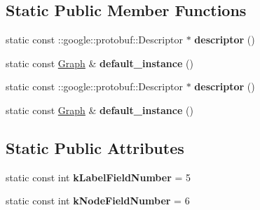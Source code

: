 \subsection*{Static Public Member Functions}
\begin{DoxyCompactItemize}
\item 
\hypertarget{classgraph_1_1Graph_a49c810d7ea8428dc769f56d61a24e052}{
static const ::google::protobuf::Descriptor $\ast$ {\bfseries descriptor} ()}
\label{classgraph_1_1Graph_a49c810d7ea8428dc769f56d61a24e052}

\item 
\hypertarget{classgraph_1_1Graph_a034b07f25ab695cb26a0bd5b307d72e4}{
static const \hyperlink{classgraph_1_1Graph}{Graph} \& {\bfseries default\_\-instance} ()}
\label{classgraph_1_1Graph_a034b07f25ab695cb26a0bd5b307d72e4}

\item 
\hypertarget{classgraph_1_1Graph_a49c810d7ea8428dc769f56d61a24e052}{
static const ::google::protobuf::Descriptor $\ast$ {\bfseries descriptor} ()}
\label{classgraph_1_1Graph_a49c810d7ea8428dc769f56d61a24e052}

\item 
\hypertarget{classgraph_1_1Graph_a034b07f25ab695cb26a0bd5b307d72e4}{
static const \hyperlink{classgraph_1_1Graph}{Graph} \& {\bfseries default\_\-instance} ()}
\label{classgraph_1_1Graph_a034b07f25ab695cb26a0bd5b307d72e4}

\end{DoxyCompactItemize}
\subsection*{Static Public Attributes}
\begin{DoxyCompactItemize}
\item 
\hypertarget{classgraph_1_1Graph_a2969c2c72eb20aaca51ff8e34e607914}{
static const int {\bfseries kLabelFieldNumber} = 5}
\label{classgraph_1_1Graph_a2969c2c72eb20aaca51ff8e34e607914}

\item 
\hypertarget{classgraph_1_1Graph_a3784b95d1729d17dcaf95adbda08c119}{
static const int {\bfseries kNodeFieldNumber} = 6}
\label{classgraph_1_1Graph_a3784b95d1729d17dcaf95adbda08c119}

\end{DoxyCompactItemize}

